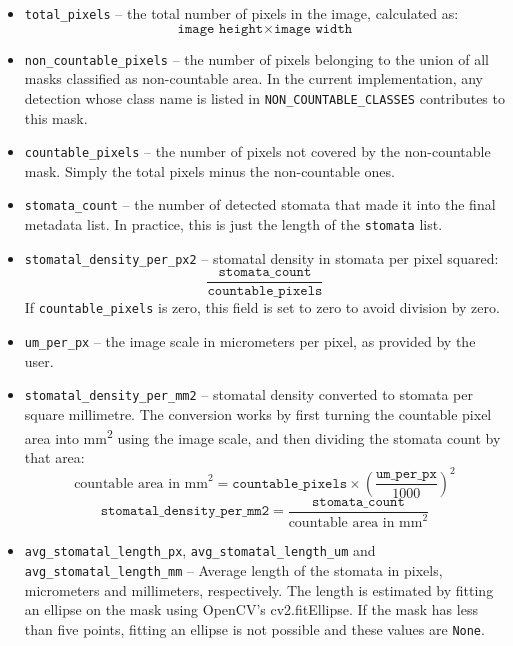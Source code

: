 \documentclass{article}
\begin{document}
\begin{itemize}
    \item \texttt{total\_pixels} -- the total number of pixels in the image, calculated as:
    \[
    \texttt{image height} \times \texttt{image width}
    \]

    \item \texttt{non\_countable\_pixels} -- the number of pixels belonging to the union of all masks classified as non-countable area. In the current implementation, any detection whose class name is listed in \texttt{NON\_COUNTABLE\_CLASSES} contributes to this mask.

    \item \texttt{countable\_pixels} -- the number of pixels not covered by the non-countable mask. Simply the total pixels minus the non-countable ones.

    \item \texttt{stomata\_count} -- the number of detected stomata that made it into the final metadata list. In practice, this is just the length of the \texttt{stomata} list.

    \item \texttt{stomatal\_density\_per\_px2} -- stomatal density in stomata per pixel squared:
    \[
    \frac{\texttt{stomata\_count}}{\texttt{countable\_pixels}}
    \]
    If \texttt{countable\_pixels} is zero, this field is set to zero to avoid division by zero.

    \item \texttt{um\_per\_px} -- the image scale in micrometers per pixel, as provided by the user.

    \item \texttt{stomatal\_density\_per\_mm2} -- stomatal density converted to stomata per square millimetre. The conversion works by first turning the countable pixel area into mm\textsuperscript{2} using the image scale, and then dividing the stomata count by that area:
    \[
    \text{countable area in mm}^2 = \texttt{countable\_pixels} \times \left(\frac{\texttt{um\_per\_px}}{1000}\right)^2
    \]
    \[
    \texttt{stomatal\_density\_per\_mm2} = \frac{\texttt{stomata\_count}}{\text{countable area in mm}^2}
    \]

    \item \texttt{avg\_stomatal\_length\_px}, \texttt{avg\_stomatal\_length\_um} and \texttt{avg\_stomatal\_length\_mm} -- Average length of the stomata in pixels, micrometers and millimeters, respectively. The length is estimated by fitting an ellipse on the mask using OpenCV's cv2.fitEllipse. If the mask has less than five points, fitting an ellipse is not possible and these values are \texttt{None}.
    

\end{itemize}
\end{document}
